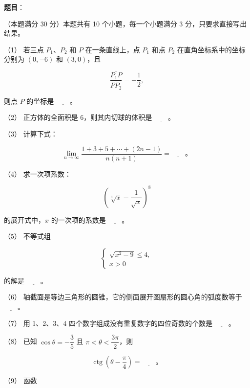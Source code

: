 \begin{answer}

\textbf{题目}：

（本题满分 30 分）本题共有 10 个小题，每一个小题满分 3 分，只要求直接写出结果。

（1） 若三点 $P_1\text{、}P_2$ 和 $P$ 在一条直线上，点 $P_1$ 和点 $P_2$ 在直角坐标系中的坐标分别为 $(0,-6)$ 和 $(3,0)$，且

\nopagebreak[4]
\[
\frac{\overline{P_1P}}{\overline{PP_2}}=-\frac12,
\]

则点 $P$ 的坐标是 $\underline{\hspace{2em}}$。

（2） 正方体的全面积是 6，则其内切球的体积是 $\underline{\hspace{2em}}$。

（3） 计算下式：

\nopagebreak[4]
\[
\lim_{n\to\infty}\frac{1+3+5+\cdots+(2n-1)}{n(n+1)}
=\underline{\hspace{2em}}\text{。}
\]

（4） 求一次项系数：

\nopagebreak[4]
\[
\left(\sqrt[3]{x}-\frac1{\sqrt{x}}\right)^8
\]

的展开式中，$x$ 的一次项的系数是 $\underline{\hspace{2em}}$。

（5） 不等式组

\nopagebreak[4]
\[
\begin{cases}
\sqrt{x^2-9}\le4,\\
x>0
\end{cases}
\]

的解是 $\underline{\hspace{2em}}$。

（6） 轴截面是等边三角形的圆锥，它的侧面展开图扇形的圆心角的弧度数等于 $\underline{\hspace{2em}}$。

（7） 用 1、2、3、4 四个数字组成没有重复数字的四位奇数的个数是 $\underline{\hspace{2em}}$。

（8） 已知 $\cos\theta=-\dfrac35$ 且 $\pi<\theta<\dfrac{3\pi}2$，则

\nopagebreak[4]
\[
\operatorname{ctg}\left(\theta-\frac\pi4\right)=\underline{\hspace{2em}}\text{。}
\]

（9） 函数


\end{answer}
